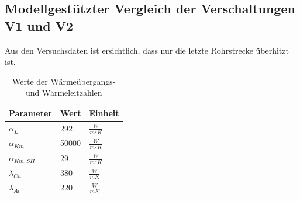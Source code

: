 \subsection{Modellgestützter Vergleich der Verschaltungen V1 und V2}
\label{subsec:Modellgestützter Vergleich der Verschaltungen V1 und V2}

Aus den Versuchsdaten ist ersichtlich, dass nur die letzte Rohrstrecke überhitzt ist.


\begin{table}[h!]
\centering
\caption{Werte der Wärmeübergangs- und Wärmeleitzahlen}
\label{tab:Werte der Wärmeübergangs- und Wärmeleitzahlen}
\renewcommand{\arraystretch}{1.2}
\begin{tabular}{|l|l|l|}

\hline
Parameter        & Wert  & Einheit           \\ \hline
$\alpha_{L}$     & 292   & $\frac{W}{m^2 K}$ \\
$\alpha_{Km}$    & 50000 & $\frac{W}{m^2 K}$ \\
$\alpha_{Km,SH}$ & 29    & $\frac{W}{m^2 K}$ \\
$\lambda_{Cu}$   & 380   & $\frac{W}{m K}$   \\
$\lambda_{Al}$   & 220   & $\frac{W}{m K}$   \\ \hline
\end{tabular}
\end{table}

